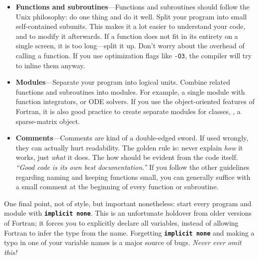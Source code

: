 \documentclass[openany,oneside]{report}
\newcommand{\keyword}[1]{\texttt{\bfseries\color{DarkBlue}#1}}
\begin{document}
\begin{itemize}
  \item\textbf{Functions and subroutines}---Functions and subroutines should follow the Unix philosophy: do one thing and do it well.
    Split your program into small self-contained subunits.
    This makes it a lot easier to understand your code, and to modify it afterwards.
    If a function does not fit in its entirety on a single screen, it is too long---split it up.
    Don't worry about the overhead of calling a function.
    If you use optimization flags like \texttt{-O3}, the compiler will try to inline them anyway.
  \item\textbf{Modules}---Separate your program into logical units.
    Combine related functions and subroutines into modules.
    For example, a single module with function integrators, or ODE solvers.
    If you use the object-oriented features of Fortran, it is also good practice to create separate modules for classes, \eg, a sparse-matrix object.
  \item\textbf{Comments}---Comments are kind of a double-edged sword.
    If used wrongly, they can actually hurt readability.
    The golden rule is: never explain \emph{how} it works, just \emph{what} it does.
    The how should be evident from the code itself.
    \emph{``Good code is its own best documentation.''} If you follow the other guidelines regarding naming and keeping functions small, you can generally suffice with a small comment at the beginning of every function or subroutine.
\end{itemize}
One final point, not of style, but important nonetheless: start every program and module with \keyword{implicit none}.
This is an unfortunate holdover from older versions of Fortran; it forces you to explicitly declare all variables, instead of allowing Fortran to infer the type from the name.
Forgetting \keyword{implicit none} and making a typo in one of your variable names is a major source of bugs.
\emph{Never ever omit this!}

\appendix
\end{document}
